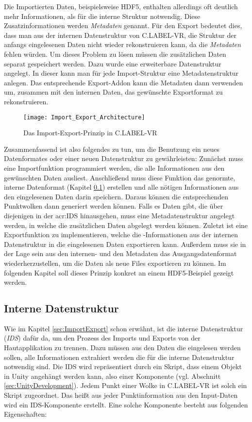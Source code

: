 Die Importierten Daten, beispielsweise HDF5, enthalten allerdings oft deutlich mehr Informationen, als für die interne Struktur notwendig. Diese Zusatzinformationen werden \textit{Metadaten} genannt. Für den Export bedeutet dies, dass man aus der internen Datenstruktur von C.LABEL-VR, die Struktur der anfangs eingelesenen Daten nicht wieder rekonstruieren kann, da die \textit{Metadaten} fehlen würden. Um dieses Problem zu lösen müssen die zusätzlichen Daten separat gespeichert werden. Dazu wurde eine erweiterbare Datenstruktur angelegt. In dieser kann man für jede Import-Struktur eine Metadatenstruktur anlegen. Das entsprechende Export-Addon kann die Metadaten dann verwenden um, zusammen mit den internen Daten, das gewünschte Exportformat zu rekonstruieren. \\

\begin{figure}%
	\centering
    \texttt{[image: Import\_Export\_Architecture]}
    \caption{Das Import-Export-Prinzip in C.LABEL-VR}
    \label{fig:ImportExport}
\end{figure}

Zusammenfassend ist also folgendes zu tun, um die Benutzung ein neues Datenformates oder einer neuen Datenstruktur zu gewährleisten: Zunächst muss eine Importfunktion programmiert werden, die alle Informationen aus den gewünschten Daten ausliest. Anschließend muss diese Funktion das genormte, interne Datenformat (Kapitel \ref{sec:IDS}) erstellen und alle nötigen Informationen aus den eingelesenen Daten darin speichern. Daraus können die entsprechenden Punktwolken dann generiert werden können. Falls es Daten gibt, die über diejenigen in der \acrshort{acr:IDS} hinausgehen, muss eine Metadatenstruktur angelegt werden, in welche die zusätzlichen Daten abgelegt werden können. Zuletzt ist eine Exportfunktion zu implementieren, welche die -Informationen aus der internen Datenstruktur in die eingelesenen Daten exportieren kann. Außerdem muss sie in der Lage sein aus den internen- und den Metadaten das Ausgangsdatenformat wiederherzustellen, um die Daten als neue Files exportieren zu können. Im folgenden Kapitel soll dieses Prinzip konkret an einem HDF5-Beispiel gezeigt werden.

\subsection{Interne Datenstruktur}
\label{sec:IDS}
Wie im Kapitel \ref{sec:ImportExport} schon erwähnt, ist die interne Datenstruktur (\textit{IDS}) dafür da, um den Prozess des Imports und Exports von der Hautapplikation zu trennen. Dazu müssen aus den Daten die eingelesen werden sollen, alle Informationen extrahiert werden die für die interne Datenstruktur notwendig sind. Die IDS wird repräsentiert durch ein Skript, dass einem Objekt in Unity angehängt werden kann, also einer Komponente (vgl. Abschnitt \ref{sec:UnityDevelopment}). Jedem Punkt einer Wolke in C.LABEL-VR ist solch ein Skript zugeordnet. Das heißt aus jeder Punktinformation aus den Input-Daten wird ein IDS-Komponente erstellt. Eine solche Komponente besteht aus folgenden Eigenschaften:

